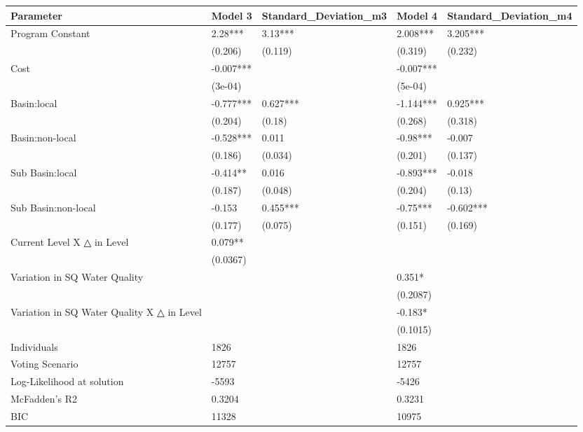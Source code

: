 \begin{table}[ht]
\centering
\begin{tabular}{lllll}
  \hline
Parameter & Model 3 & Standard\_Deviation\_m3 & Model 4 & Standard\_Deviation\_m4 \\ 
  \hline
Program Constant & 2.28*** & 3.13*** & 2.008*** & 3.205*** \\ 
   & (0.206) & (0.119) & (0.319) & (0.232) \\ 
  Cost & -0.007*** &  & -0.007*** &  \\ 
   & (3e-04) &  & (5e-04) &  \\ 
  Basin:local & -0.777*** & 0.627*** & -1.144*** & 0.925*** \\ 
   & (0.204) & (0.18) & (0.268) & (0.318) \\ 
  Basin:non-local & -0.528*** & 0.011 & -0.98*** & -0.007 \\ 
   & (0.186) & (0.034) & (0.201) & (0.137) \\ 
  Sub Basin:local & -0.414** & 0.016 & -0.893*** & -0.018 \\ 
   & (0.187) & (0.048) & (0.204) & (0.13) \\ 
  Sub Basin:non-local & -0.153 & 0.455*** & -0.75*** & -0.602*** \\ 
   & (0.177) & (0.075) & (0.151) & (0.169) \\ 
  Current Level X △ in Level & 0.079** &  &  &  \\ 
   & (0.0367) &  &  &  \\ 
  Variation in SQ Water Quality &  &  & 0.351* &  \\ 
   &  &  & (0.2087) &  \\ 
  Variation in SQ Water Quality X △ in Level &  &  & -0.183* &  \\ 
   &  &  & (0.1015) &  \\ 
  Individuals & 1826 &  & 1826 &  \\ 
  Voting Scenario & 12757 &  & 12757 &  \\ 
  Log-Likelihood at solution & -5593 &  & -5426 &  \\ 
  McFadden’s R2 & 0.3204 &  & 0.3231 &  \\ 
  BIC & 11328 &  & 10975 &  \\ 
   \hline
\end{tabular}
\end{table}
